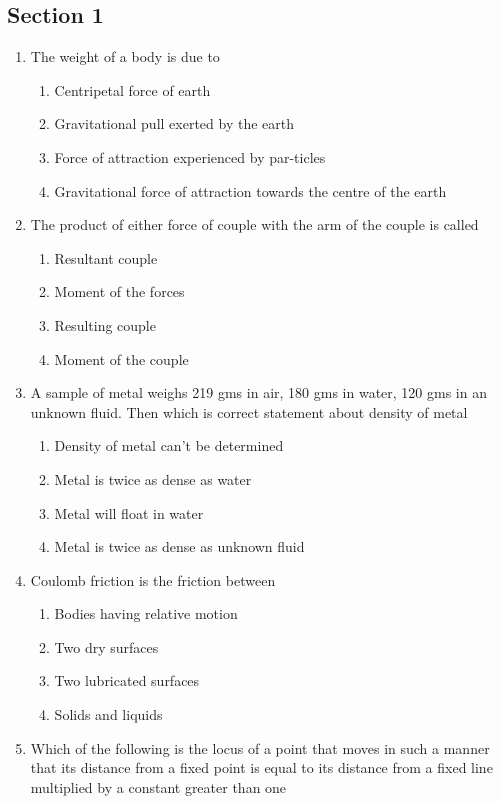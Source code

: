\documentclass[11pt,a4paper]{article}
\begin{document}
\subsection*{Section 1}
\begin{enumerate}
\item{The weight of a body is due to}
\begin{enumerate}[label=\Alph*.]
\item{Centripetal force of earth}
\item{Gravitational pull exerted by the earth}
\item{Force of attraction experienced by par-ticles}
\item{Gravitational force of attraction towards the centre of the earth}
\end{enumerate}
\item{The product of either force of couple with the arm of the couple is called}
\begin{enumerate}[label=\Alph*.]
\item{Resultant couple}
\item{Moment of the forces}
\item{Resulting couple}
\item{Moment of the couple}
\end{enumerate}
\item{A sample of metal weighs 219 gms in air, 180 gms in water, 120 gms in an unknown fluid. Then which is correct statement about density of metal}
\begin{enumerate}[label=\Alph*.]
\item{Density of metal can't be determined}
\item{Metal is twice as dense as water}
\item{Metal will float in water}
\item{Metal is twice as dense as unknown fluid}
\end{enumerate}
\item{Coulomb friction is the friction between}
\begin{enumerate}[label=\Alph*.]
\item{Bodies having relative motion}
\item{Two dry surfaces}
\item{Two lubricated surfaces}
\item{Solids and liquids}
\end{enumerate}
\item{Which of the following is the locus of a point that moves in such a manner that its distance from a fixed point is equal to its distance from a fixed line multiplied by a constant greater than one}

\end{enumerate}
\end{document}
